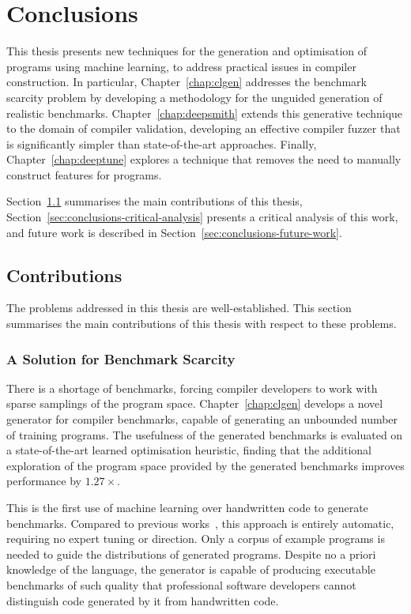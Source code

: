 \chapter{Conclusions}
\label{chap:conclusions}

This thesis presents new techniques for the generation and optimisation of programs using machine learning, to address practical issues in compiler construction. In particular, Chapter~\ref{chap:clgen} addresses the benchmark scarcity problem by developing a methodology for the unguided generation of realistic benchmarks. Chapter~\ref{chap:deepsmith} extends this generative technique to the domain of compiler validation, developing an effective compiler fuzzer that is significantly simpler than state-of-the-art approaches. Finally, Chapter~\ref{chap:deeptune} explores a technique that removes the need to manually construct features for programs.

Section~\ref{sec:conclusions-contributions} summarises the main contributions of this thesis, Section~\ref{sec:conclusions-critical-analysis} presents a critical analysis of this work, and future work is described in Section~\ref{sec:conclusions-future-work}.


\section{Contributions}
\label{sec:conclusions-contributions}

The problems addressed in this thesis are well-established. This section summarises the main contributions of this thesis with respect to these problems.


\subsection{A Solution for Benchmark Scarcity}

There is a shortage of benchmarks, forcing compiler developers to work with sparse samplings of the program space. Chapter~\ref{chap:clgen} develops a novel generator for compiler benchmarks, capable of generating an unbounded number of training programs. The usefulness of the generated benchmarks is evaluated on a state-of-the-art learned optimisation heuristic, finding that the additional exploration of the program space provided by the generated benchmarks improves performance by $1.27\times$.

This is the first use of machine learning over handwritten code to generate benchmarks. Compared to previous works~\cite{Chiu2015}, this approach is entirely automatic, requiring no expert tuning or direction. Only a corpus of example programs is needed to guide the distributions of generated programs. Despite no a priori knowledge of the language, the generator is capable of producing executable benchmarks of such quality that professional software developers cannot distinguish code generated by it from handwritten code.

